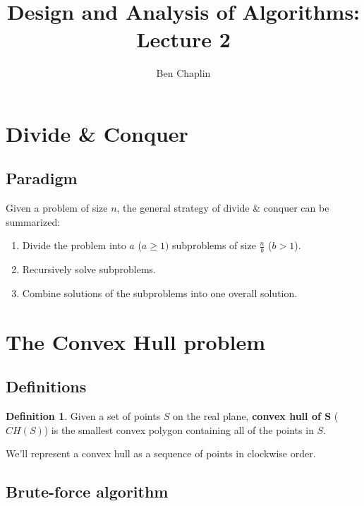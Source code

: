 \documentclass[11pt]{article}
\title{Design and Analysis of Algorithms: Lecture 2}
\author{Ben Chaplin}
\date{}
\theoremstyle{plain}
\theoremstyle{definition}
\newtheorem*{defn}{Definition}
\begin{document}
\maketitle
\tableofcontents

\section{Divide \& Conquer}
\subsection{Paradigm}

Given a problem of size $n$, the general strategy of divide \& conquer can be summarized:
\begin{enumerate}
    \item Divide the problem into $a$ ($a \geq 1)$ subproblems of size $\frac{n}{b}$ ($b > 1$).
    \item Recursively solve subproblems.
    \item Combine solutions of the subproblems into one overall solution.
\end{enumerate}

\section{The Convex Hull problem}
\subsection{Definitions}

\begin{defn}
    Given a set of points $S$ on the real plane, \textbf{convex hull of S} ($CH(S)$) is the smallest 
    convex polygon containing all of the points in $S$.
\end{defn}

We'll represent a convex hull as a sequence of points in clockwise order.

\subsection{Brute-force algorithm}
\end{document}
